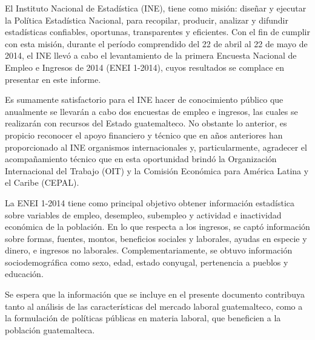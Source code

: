 \documentclass[12pt,letterpaper,twoside]{book}
\newcommand{\comop}{}
\newcommand{\comcl}{}
\newcommand{\swapgeometry}{\clearpage
\newgeometry{left=28.60mm, right=21.56mm, top=24.43mm, bottom=27.86mm}
\setlength{\footskip}{26pt}}
\let\origdoublepage\cleardoublepage
\newcommand{\clearemptydoublepage}{
  		\clearpage
  		{\pagestyle{empty}\origdoublepage}}
\let\cleardoublepage\clearemptydoublepage
\begin{document}
\swapgeometry

$\ $\\[1cm]

\tableofcontents

\cleardoublepage
	\pagestyle{estandar}
	\setcounter{page}{1}
	\setlength{\arrayrulewidth}{1.0pt}





\cleardoublepage


$\ $\\[1cm]
\thispagestyle{empty}




$\ $\\

El Instituto Nacional de Estadística (INE), tiene como misión: \comop diseñar y ejecutar la Política Estadística Nacional, para recopilar, producir, analizar y difundir estadísticas confiables, oportunas, transparentes y eficientes\comcl.  Con el fin de cumplir con esta misión, durante el período comprendido del 22 de abril al 22 de mayo de 2014, el INE llevó a cabo el levantamiento de la primera Encuesta Nacional de Empleo e Ingresos de 2014 (ENEI 1-2014), cuyos resultados se complace en presentar en este informe. 

Es sumamente satisfactorio para el INE hacer de conocimiento público que anualmente se llevarán a cabo dos encuestas de empleo e ingresos, las cuales se realizarán con recursos del Estado guatemalteco. No obstante lo anterior, es propicio reconocer el apoyo financiero y técnico que en años anteriores han proporcionado al INE organismos internacionales y, particularmente, agradecer el acompañamiento técnico que en esta oportunidad brindó la Organización Internacional del Trabajo (OIT) y la Comisión Económica para América Latina y el Caribe (CEPAL).

La ENEI 1-2014 tiene como principal objetivo obtener información estadística sobre variables de empleo, desempleo, subempleo y actividad e inactividad económica de la población. En lo que respecta a los ingresos, se captó información sobre formas, fuentes, montos, beneficios sociales y laborales, ayudas en especie y dinero, e ingresos no laborales. Complementariamente, se obtuvo información sociodemográfica como sexo, edad, estado conyugal, pertenencia a pueblos y educación. 

Se espera que la información que se incluye en el presente documento contribuya tanto al análisis de las características del mercado laboral guatemalteco, como a la formulación de políticas públicas en materia laboral, que beneficien a la población guatemalteca.
\end{document}
